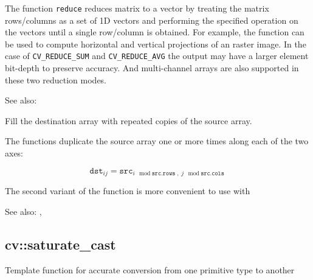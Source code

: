 The function \texttt{reduce} reduces matrix to a vector by treating the matrix rows/columns as a set of 1D vectors and performing the specified operation on the vectors until a single row/column is obtained. For example, the function can be used to compute horizontal and vertical projections of an raster image. In the case of \texttt{CV\_REDUCE\_SUM} and \texttt{CV\_REDUCE\_AVG} the output may have a larger element bit-depth to preserve accuracy. And multi-channel arrays are also supported in these two reduction modes. 

See also: 

Fill the destination array with repeated copies of the source array.

\begin{description}
\end{description}

The functions  duplicate the source array one or more times along each of the two axes:

\[\texttt{dst}_{ij}=\texttt{src}_{i\mod\texttt{src.rows},\;j\mod\texttt{src.cols}}\]

The second variant of the function is more convenient to use with 

See also: , 

\ifplastex
{}\label{cppfunc.saturatecast}
\else
\subsection{cv::saturate\_cast}\label{cppfunc.saturatecast}
\fi
Template function for accurate conversion from one primitive type to another


